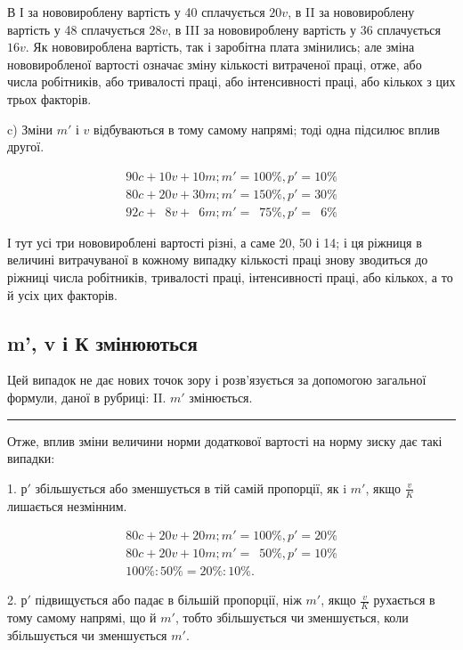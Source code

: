 
В І за нововироблену вартість у 40 сплачується $20 v$, в II
за нововироблену вартість у 48 сплачується $28 v$, в III за нововироблену
вартість у 36 сплачується $16 v$. Як нововироблена
вартість, так і заробітна плата змінились; але зміна нововиробленої
вартості означає зміну кількості витраченої праці, отже,
або числа робітників, або тривалості праці, або інтенсивності
праці, або кількох з цих трьох факторів.

c) Зміни $m'$ і $v$ відбуваються в тому самому напрямі; тоді
одна підсилює вплив другої.

\begin{gather*}
90 c + 10 v + 10 m; m' = 100\%, p' = 10\% \\
80 c + 20 v + 30 m; m' = 150\%, p' = 30\% \\
92 c + \phantom{0}8 v + \phantom{0}6 m; m' = \phantom{1}75\%, p' = \phantom{1}6\%
\end{gather*}

\noindent{}І тут усі три нововироблені вартості різні, а саме 20, 50 і 14;
і ця ріжниця в величині витрачуваної в кожному випадку кількості
праці знову зводиться до ріжниці числа робітників, тривалості
праці, інтенсивності праці, або кількох, а то й усіх цих факторів.

\subsection[m', v і К змінюються]{m', v і К змінюються\footnotemarkZ{}}

\noindent{}Цей випадок не дає нових точок зору і розв’язується за допомогою
загальної формули, даної в рубриці: II. $m'$ змінюється.

\pfbreak{}

Отже, вплив зміни величини норми додаткової вартості на
норму зиску дає такі випадки:

1. $р'$ збільшується або зменшується в тій самій пропорції, як
i $m'$, якщо $\frac{v}{K}$  лишається незмінним.

\begin{gather*}
80 c + 20 v + 20 m; m' = 100\%, p' = 20\% \\
80 c + 20 v + 10 m; m' = \phantom{1}50\%, p' = 10\% \\
100\% : 50\% = 20\% : 10\%.
\end{gather*}

2. $р'$ підвищується або падає в більшій пропорції, ніж $m'$,
якщо $\frac{v}{K}$ рухається в тому самому напрямі, що й $m'$, тобто
збільшується чи зменшується, коли збільшується чи зменшується
$m'$.

